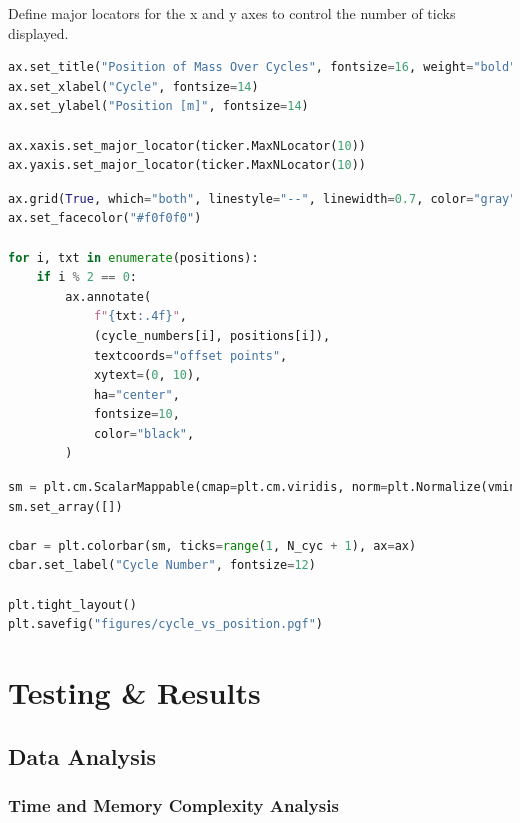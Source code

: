\documentclass[12pt, a4paper, oneside]{report}
\begin{document}
Define major locators for the x and y axes to control the number of ticks displayed.
\begin{lstlisting}[language=Python, caption={Labels and Locators}]
ax.set_title("Position of Mass Over Cycles", fontsize=16, weight="bold")
ax.set_xlabel("Cycle", fontsize=14)
ax.set_ylabel("Position [m]", fontsize=14)

ax.xaxis.set_major_locator(ticker.MaxNLocator(10))
ax.yaxis.set_major_locator(ticker.MaxNLocator(10))
\end{lstlisting}



\begin{lstlisting}[language=Python, caption={Grid, Background and Annotations}]
ax.grid(True, which="both", linestyle="--", linewidth=0.7, color="gray")
ax.set_facecolor("#f0f0f0")

for i, txt in enumerate(positions):
    if i % 2 == 0:
        ax.annotate(
            f"{txt:.4f}",
            (cycle_numbers[i], positions[i]),
            textcoords="offset points",
            xytext=(0, 10),
            ha="center",
            fontsize=10,
            color="black",
        )
\end{lstlisting}


\begin{lstlisting}[language=Python, caption={Color Bar and Save}]
sm = plt.cm.ScalarMappable(cmap=plt.cm.viridis, norm=plt.Normalize(vmin=1, vmax=N_cyc))
sm.set_array([])

cbar = plt.colorbar(sm, ticks=range(1, N_cyc + 1), ax=ax)
cbar.set_label("Cycle Number", fontsize=12)

plt.tight_layout()
plt.savefig("figures/cycle_vs_position.pgf")
\end{lstlisting}










\chapter{Testing \& Results}

\section{Data Analysis}
\subsection{Time and Memory Complexity Analysis}
\end{document}
